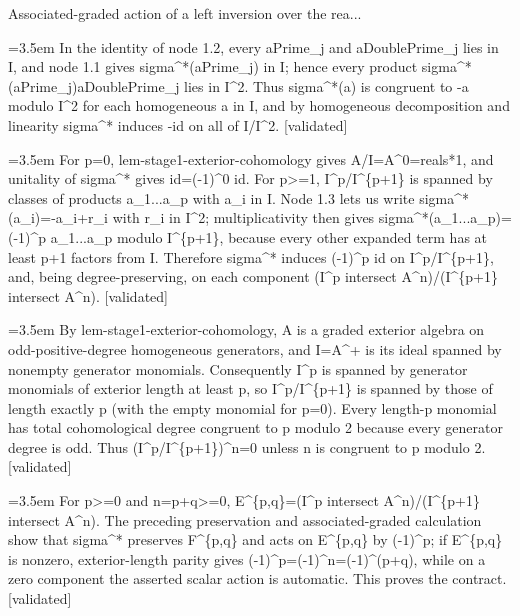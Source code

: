 \documentclass{article}
\newcommand{\step}[1]{\par\noindent\hangindent=3.5em\hangafter=1%
  \makebox[3.5em][l]{\textbf{#1.}}}
\newcommand{\steptag}[1]{\hfill{\small\textsf{[#1]}}}
\begin{document}
\begin{proofbox}{Associated-graded action of a left inversion over the rea...}
\step{1.3} In the identity of node 1.2, every aPrime\_j and aDoublePrime\_j lies in I, and node 1.1 gives sigma\textasciicircum{}*(aPrime\_j) in I; hence every product sigma\textasciicircum{}*(aPrime\_j)aDoublePrime\_j lies in I\textasciicircum{}2. Thus sigma\textasciicircum{}*(a) is congruent to -a modulo I\textasciicircum{}2 for each homogeneous a in I, and by homogeneous decomposition and linearity sigma\textasciicircum{}* induces -id on all of I/I\textasciicircum{}2. \steptag{validated} \\[4pt]
\step{1.4} For p=0, lem-stage1-exterior-cohomology gives A/I=A\textasciicircum{}0=reals*1, and unitality of sigma\textasciicircum{}* gives id=(-1)\textasciicircum{}0 id. For p>=1, I\textasciicircum{}p/I\textasciicircum{}\{p+1\} is spanned by classes of products a\_1...a\_p with a\_i in I. Node 1.3 lets us write sigma\textasciicircum{}*(a\_i)=-a\_i+r\_i with r\_i in I\textasciicircum{}2; multiplicativity then gives sigma\textasciicircum{}*(a\_1...a\_p)=(-1)\textasciicircum{}p a\_1...a\_p modulo I\textasciicircum{}\{p+1\}, because every other expanded term has at least p+1 factors from I. Therefore sigma\textasciicircum{}* induces (-1)\textasciicircum{}p id on I\textasciicircum{}p/I\textasciicircum{}\{p+1\}, and, being degree-preserving, on each component (I\textasciicircum{}p intersect A\textasciicircum{}n)/(I\textasciicircum{}\{p+1\} intersect A\textasciicircum{}n). \steptag{validated} \\[4pt]
\step{1.5} By lem-stage1-exterior-cohomology, A is a graded exterior algebra on odd-positive-degree homogeneous generators, and I=A\textasciicircum{}+ is its ideal spanned by nonempty generator monomials. Consequently I\textasciicircum{}p is spanned by generator monomials of exterior length at least p, so I\textasciicircum{}p/I\textasciicircum{}\{p+1\} is spanned by those of length exactly p (with the empty monomial for p=0). Every length-p monomial has total cohomological degree congruent to p modulo 2 because every generator degree is odd. Thus (I\textasciicircum{}p/I\textasciicircum{}\{p+1\})\textasciicircum{}n=0 unless n is congruent to p modulo 2. \steptag{validated} \\[4pt]
\step{1.6} For p>=0 and n=p+q>=0, E\textasciicircum{}\{p,q\}=(I\textasciicircum{}p intersect A\textasciicircum{}n)/(I\textasciicircum{}\{p+1\} intersect A\textasciicircum{}n). The preceding preservation and associated-graded calculation show that sigma\textasciicircum{}* preserves F\textasciicircum{}\{p,q\} and acts on E\textasciicircum{}\{p,q\} by (-1)\textasciicircum{}p; if E\textasciicircum{}\{p,q\} is nonzero, exterior-length parity gives (-1)\textasciicircum{}p=(-1)\textasciicircum{}n=(-1)\textasciicircum{}(p+q), while on a zero component the asserted scalar action is automatic. This proves the contract. \steptag{validated} \\[4pt]
\end{proofbox}
\end{document}
